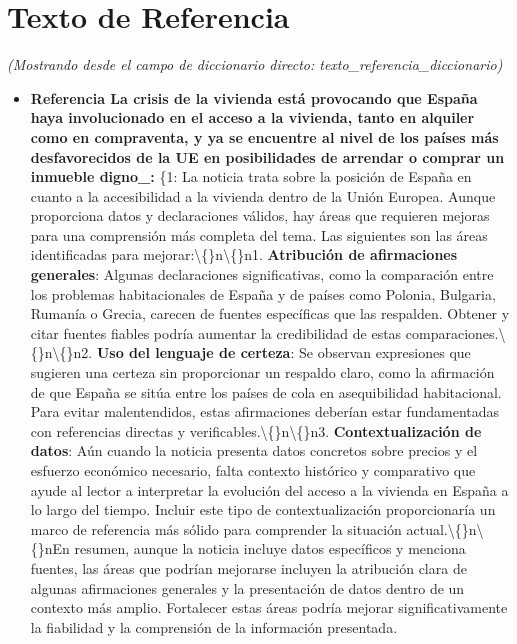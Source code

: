 \documentclass[10pt,a4paper]{article}
\begin{document}
\section*{Texto de Referencia}
    \textit{(Mostrando desde el campo de diccionario directo: texto\_referencia\_diccionario)}
    \begin{itemize}[leftmargin=*]
            \item \textbf{Referencia La crisis de la vivienda est\'{a} provocando que Espa\~{n}a haya involucionado en el acceso a la vivienda, tanto en alquiler como en compraventa, y ya se encuentre al nivel de los pa\'{i}ses m\'{a}s desfavorecidos de la UE en posibilidades de arrendar o comprar un inmueble digno\_:} \{{}1{}: {}La noticia trata sobre la posici\'{o}n de Espa\~{n}a en cuanto a la accesibilidad a la vivienda dentro de la Uni\'{o}n Europea. Aunque proporciona datos y declaraciones v\'{a}lidos, hay \'{a}reas que requieren mejoras para una comprensi\'{o}n m\'{a}s completa del tema. Las siguientes son las \'{a}reas identificadas para mejorar:\textbackslash\{\}n\textbackslash\{\}n1. \textbf{Atribuci\'{o}n de afirmaciones generales}: Algunas declaraciones significativas, como la comparaci\'{o}n entre los problemas habitacionales de Espa\~{n}a y de pa\'{i}ses como Polonia, Bulgaria, Ruman\'{i}a o Grecia, carecen de fuentes espec\'{i}ficas que las respalden. Obtener y citar fuentes fiables podr\'{i}a aumentar la credibilidad de estas comparaciones.\textbackslash\{\}n\textbackslash\{\}n2. \textbf{Uso del lenguaje de certeza}: Se observan expresiones que sugieren una certeza sin proporcionar un respaldo claro, como la afirmaci\'{o}n de que {}Espa\~{n}a se sit\'{u}a entre los pa\'{i}ses de cola en {}asequibilidad{} habitacional{}. Para evitar malentendidos, estas afirmaciones deber\'{i}an estar fundamentadas con referencias directas y verificables.\textbackslash\{\}n\textbackslash\{\}n3. \textbf{Contextualizaci\'{o}n de datos}: A\'{u}n cuando la noticia presenta datos concretos sobre precios y el esfuerzo econ\'{o}mico necesario, falta contexto hist\'{o}rico y comparativo que ayude al lector a interpretar la evoluci\'{o}n del acceso a la vivienda en Espa\~{n}a a lo largo del tiempo. Incluir este tipo de contextualizaci\'{o}n proporcionar\'{i}a un marco de referencia m\'{a}s s\'{o}lido para comprender la situaci\'{o}n actual.\textbackslash\{\}n\textbackslash\{\}nEn resumen, aunque la noticia incluye datos espec\'{i}ficos y menciona fuentes, las \'{a}reas que podr\'{i}an mejorarse incluyen la atribuci\'{o}n clara de algunas afirmaciones generales y la presentaci\'{o}n de datos dentro de un contexto m\'{a}s amplio. Fortalecer estas \'{a}reas podr\'{i}a mejorar significativamente la fiabilidad y la comprensi\'{o}n de la informaci\'{o}n presentada.{}

\end{itemize}
\end{document}
